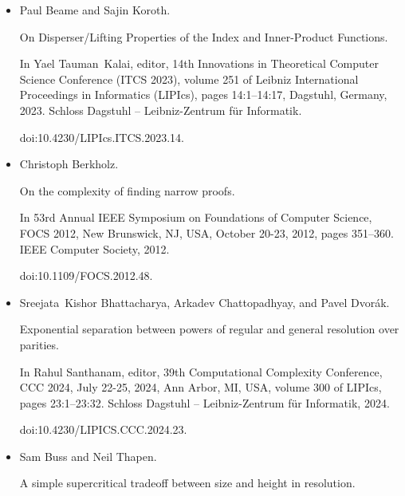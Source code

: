 \begin{itemize}
Journal of Computer and System Sciences, 74(3):323–334, 2008.


Computational Complexity 2003.


doi:10.1016/j.jcss.2007.06.025.





\item 
[5]

Paul Beame and Sajin Koroth.


On Disperser/Lifting Properties of the Index and Inner-Product
Functions.


In Yael Tauman Kalai, editor, 14th Innovations in Theoretical
Computer Science Conference (ITCS 2023), volume 251 of Leibniz
International Proceedings in Informatics (LIPIcs), pages 14:1–14:17,
Dagstuhl, Germany, 2023. Schloss Dagstuhl – Leibniz-Zentrum für
Informatik.


doi:10.4230/LIPIcs.ITCS.2023.14.





\item 
[6]

Christoph Berkholz.


On the complexity of finding narrow proofs.


In 53rd Annual IEEE Symposium on Foundations of Computer
Science, FOCS 2012, New Brunswick, NJ, USA, October 20-23, 2012, pages
351–360. IEEE Computer Society, 2012.


doi:10.1109/FOCS.2012.48.





\item 
[7]

Sreejata Kishor Bhattacharya, Arkadev Chattopadhyay, and Pavel Dvorák.


Exponential separation between powers of regular and general
resolution over parities.


In Rahul Santhanam, editor, 39th Computational Complexity
Conference, CCC 2024, July 22-25, 2024, Ann Arbor, MI, USA, volume 300
of LIPIcs, pages 23:1–23:32. Schloss Dagstuhl – Leibniz-Zentrum
für Informatik, 2024.


doi:10.4230/LIPICS.CCC.2024.23.





\item 
[8]

Sam Buss and Neil Thapen.


A simple supercritical tradeoff between size and height in
resolution.



\end{itemize}

